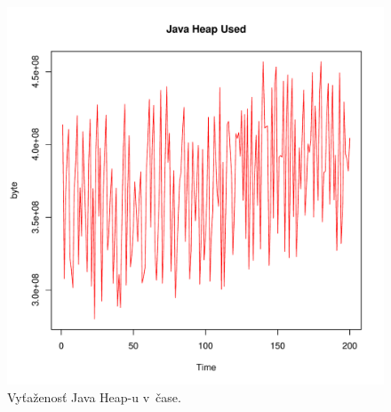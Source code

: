 \documentclass[12pt,a4paper,oneside,final]{article}
\theoremstyle{definition}
\theoremstyle{remark}
\numberwithin{equation}{section}
\begin{document}
\begin{figure}[H] 
    \begin{center}
        \includegraphics[width=.8\textwidth]{images/heap_series.pdf}
        \caption{Vyťaženosť Java Heap-u v~čase.}
        \label{obr:heap} %
    \end{center}
\end{figure}
\end{document}
